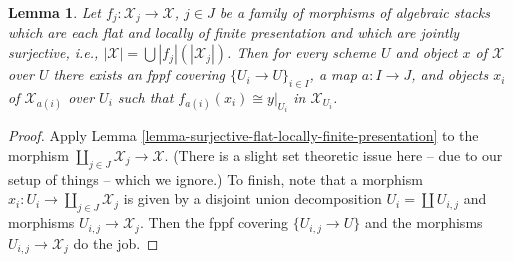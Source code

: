 \documentclass[10pt,a4paper]{amsart}
\theoremstyle{plain}
\newtheorem{lemma}[subsection]{Lemma}
\theoremstyle{definition}
\theoremstyle{remark}
\numberwithin{equation}{subsection}
\begin{document}
\begin{lemma}
\label{lemma-surjective-family-flat-locally-finite-presentation}
Let $f_j : \mathcal{X}_j \to \mathcal{X}$, $j \in J$ be a family of morphisms
of algebraic stacks which are each flat and locally of finite presentation
and which are jointly surjective, i.e.,
$|\mathcal{X}| = \bigcup |f_j|(|\mathcal{X}_j|)$.
Then for every scheme $U$ and object $x$ of $\mathcal{X}$ over $U$
there exists an fppf covering $\{U_i \to U\}_{i \in I}$, a map
$a : I \to J$, and objects $x_i$ of $\mathcal{X}_{a(i)}$ over $U_i$
such that $f_{a(i)}(x_i) \cong y|_{U_i}$ in $\mathcal{X}_{U_i}$.
\end{lemma}

\begin{proof}
Apply
Lemma \ref{lemma-surjective-flat-locally-finite-presentation}
to the morphism $\coprod_{j \in J} \mathcal{X}_j \to \mathcal{X}$.
(There is a slight set theoretic issue here -- due to our setup of
things -- which we ignore.) To finish, note that a morphism
$x_i : U_i \to \coprod_{j \in J} \mathcal{X}_j$ is given by a
disjoint union decomposition $U_i = \coprod U_{i, j}$ and morphisms
$U_{i, j} \to \mathcal{X}_j$. Then the fppf covering $\{U_{i, j} \to U\}$
and the morphisms $U_{i, j} \to \mathcal{X}_j$ do the job.
\end{proof}
\end{document}
